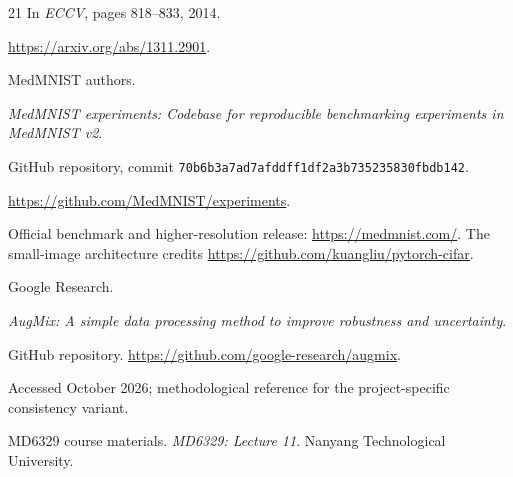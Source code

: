\begin{thebibliography}{21}
In \emph{ECCV}, pages 818--833, 2014.

\url{https://arxiv.org/abs/1311.2901}.


MedMNIST authors.

\emph{MedMNIST experiments: Codebase for reproducible benchmarking experiments in MedMNIST v2}.

GitHub repository, commit \texttt{70b6b3a7ad7afddff1df2a3b735235830fbdb142}.

\url{https://github.com/MedMNIST/experiments}.

Official benchmark and higher-resolution release: \url{https://medmnist.com/}.
The small-image architecture credits \url{https://github.com/kuangliu/pytorch-cifar}.


Google Research.

\emph{AugMix: A simple data processing method to improve robustness and uncertainty}.

GitHub repository. \url{https://github.com/google-research/augmix}.

Accessed October 2026; methodological reference for the project-specific consistency variant.

MD6329 course materials.
\emph{MD6329: Lecture 11}. Nanyang Technological University.
\end{thebibliography}
\endgroup

